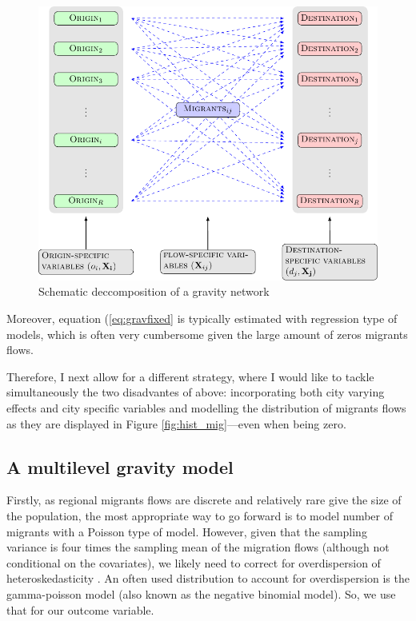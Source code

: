 \documentclass[fleqn,10pt]{SelfArx} %
\begin{document}
        \begin{figure}[ht]\centering %
          \includegraphics[width=\linewidth]{../fig/gravity_network.pdf}
          \caption{Schematic deccomposition of a gravity network}
            \label{fig:gravity_network}
          \end{figure}
          
        Moreover, equation
        (\ref{eq:gravfixed} is typically estimated with regression
        type of models, which is often very cumbersome given the large
        amount of zeros migrants flows.

        Therefore, I next allow for a different strategy, where I
        would like to tackle simultaneously the two disadvantes of above:
        incorporating both city varying effects and city specific variables and
        modelling the distribution of migrants flows as they are
        displayed in Figure \ref{fig:hist_mig}---even when being zero.

        \subsection{A multilevel gravity model}

        Firstly, as regional migrants flows are discrete and
        relatively rare give the size of the population, the most
        appropriate way to go forward is to model number of migrants
        with a Poisson type of model. However, given that the sampling
        variance is four times the sampling mean of the migration
        flows (although not conditional on the covariates), we likely
        need to correct for overdispersion of heteroskedasticity
        \citep[][states that heteroskedasticity (rather than the
        presence of too many zeros) is responsible for the main
        differences.]{silva2006log}. An often used distribution to
        account for overdispersion is the gamma-poisson model (also
        known as the negative binomial model). So, we use that for our
        outcome variable.
\end{document}
